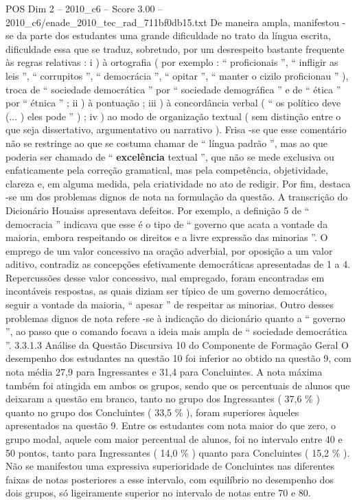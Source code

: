 \begin{textsample}{POS Dim 2 – 2010\_c6 – Score 3.00 – 2010\_c6/enade\_2010\_tec\_rad\_711bf0db15.txt}
De maneira ampla, manifestou -se da parte dos estudantes uma grande dificuldade no trato da língua escrita, dificuldade essa que se traduz, sobretudo, por um desrespeito bastante frequente às regras relativas : i ) à ortografia ( por exemplo : “ proficionais ”, “ infligir as leis ”, “ corrupitos ”, “ democrácia ”, “ opitar ”, “ manter o cizilo proficionau ” ), troca de “ sociedade democrática ” por “ sociedade demográfica ” e de “ ética ” por “ étnica ” ; ii ) à pontuação ; iii ) à concordância verbal ( “ os político deve (... ) eles pode ” ) ; iv ) ao modo de organização textual ( sem distinção entre o que seja dissertativo, argumentativo ou narrativo ).
Frisa -se que esse comentário não se restringe ao que se costuma chamar de “ língua padrão ”, mas ao que poderia ser chamado de “ \textbf{excelência} textual ”, que não se mede exclusiva ou enfaticamente pela correção gramatical, mas pela competência, objetividade, clareza e, em alguma medida, pela criatividade no ato de redigir.
Por fim, destaca -se um dos problemas dignos de nota na formulação da questão.
A transcrição do Dicionário Houaiss apresentava defeitos.
Por exemplo, a definição 5 de “ democracia ” indicava que esse é o tipo de “ governo que acata a vontade da maioria, embora respeitando os direitos e a livre expressão das minorias ”.
O emprego de um valor concessivo na oração adverbial, por oposição a um valor aditivo, contradiz as concepções efetivamente democráticas apresentadas de 1 a 4.
Repercussões desse valor concessivo, mal empregado, foram encontradas em incontáveis respostas, as quais diziam ser típico de um governo democrático, seguir a vontade da maioria, “ apesar ” de respeitar as minorias.
Outro desses problemas dignos de nota refere -se à indicação do dicionário quanto a “ governo ”, ao passo que o comando focava a ideia mais ampla de “ sociedade democrática ”. 3.3.1.3 Análise da Questão Discursiva 10 do Componente de Formação Geral O desempenho dos estudantes na questão 10 foi inferior ao obtido na questão 9, com nota média 27,9 para Ingressantes e 31,4 para Concluintes.
A nota máxima também foi atingida em ambos os grupos, sendo que os percentuais de alunos que deixaram a questão em branco, tanto no grupo dos Ingressantes ( 37,6 \% ) quanto no grupo dos Concluintes ( 33,5 \% ), foram superiores àqueles apresentados na questão 9.
Entre os estudantes com nota maior do que zero, o grupo modal, aquele com maior percentual de alunos, foi no intervalo entre 40 e 50 pontos, tanto para Ingressantes ( 14,0 \% ) quanto para Concluintes ( 15,2 \% ).
Não se manifestou uma expressiva superioridade de Concluintes nas diferentes faixas de notas posteriores a esse intervalo, com equilíbrio no desempenho dos dois grupos, só ligeiramente superior no intervalo de notas entre 70 e 80.

\end{textsample}
